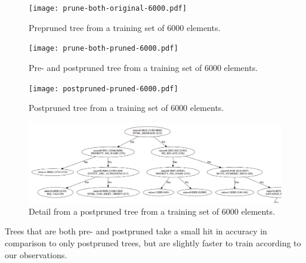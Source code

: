 \documentclass[a4paper,10pt]{article}
\begin{document}
\begin{figure}[h]
  \centering
  \begin{minipage}[c]{1.0\textwidth}
    \centering

\texttt{[image: prune-both-original-6000.pdf]}
  \end{minipage}
  \caption{Prepruned tree from a training set of 6000 elements.}
  \label{fig:prune-both-original-6000}
\end{figure}

\begin{figure}[h]
  \centering
  \begin{minipage}[c]{1.0\textwidth}
    \centering

\texttt{[image: prune-both-pruned-6000.pdf]}
  \end{minipage}
  \caption{Pre- and postpruned tree from a training set of 6000 elements.}
  \label{fig:prune-both-pruned-6000}
\end{figure}

\begin{figure}[h]
  \centering
  \begin{minipage}[c]{1.0\textwidth}
    \centering
\texttt{[image: postpruned-pruned-6000.pdf]}
  \end{minipage}
  \caption{Postpruned tree from a training set of 6000 elements.}
  \label{fig:postpruned-6000}
\end{figure}

\begin{figure}[h]
  \centering
  \begin{minipage}[c]{1.0\textwidth}
    \centering
\includegraphics[width=130mm]{detail-postpruned-pruned-6000.png}
  \end{minipage}
  \caption{Detail from a postpruned tree from a training set of 6000 elements.}
  \label{fig:detail-postpruned-6000}
\end{figure}

Trees that are both pre- and postpruned take a small hit in accuracy
in comparison to only postpruned trees, but are slightly faster to
train according to our observations.
\end{document}
